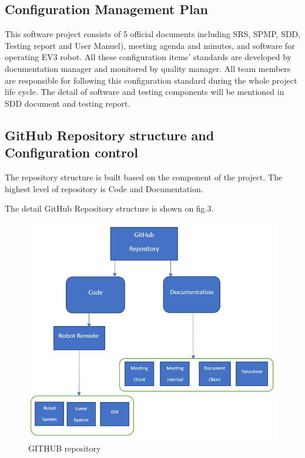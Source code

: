 \subsection{Configuration Management Plan}
This software project consists of 5 official documents including SRS, SPMP, SDD, Testing report and User Manuel), meeting agenda and minutes, and software for operating EV3 robot. All these configuration items’ standards are developed by documentation manager and monitored by quality manager. All team members are responsible for following this configuration standard during the whole project life cycle. The detail of software and testing components will be mentioned in SDD document and testing report.

\subsection{GitHub Repository structure and Configuration control}
The repository structure is built based on the component of the project. The highest level of repository is Code and Documentation. 

The detail GitHub Repository structure is shown on fig.3.

\begin{figure}[H]
	\includegraphics[width=\linewidth]{GIT.png}  %
	\caption{GITHUB repository}
	\label{fig:GITHUB repository}				
\end{figure}

